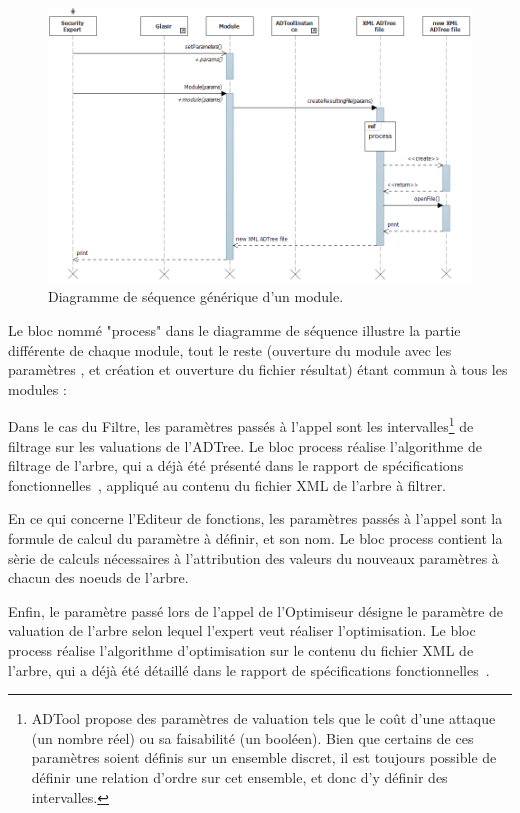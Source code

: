 	    \begin{figure}[H]
	        \centering
	        \includegraphics[height=0.75\textwidth]{figure/moduleSeqDiag.png}
	        \caption{Diagramme de séquence générique d'un module.}
	        \label{fig:moduleseq}
	    \end{figure}

Le bloc nommé "process" dans le diagramme de séquence illustre la partie différente de chaque module, tout le reste (ouverture du module avec les paramètres , et création et ouverture du fichier résultat) étant commun à tous les modules :

Dans le cas du Filtre, les paramètres passés à l'appel sont les intervalles\footnote{ADTool propose des paramètres de valuation tels que le coût d'une attaque (un nombre réel) ou sa faisabilité (un booléen). Bien que certains de ces paramètres soient définis sur un ensemble discret, il est toujours possible de définir une relation d'ordre sur cet ensemble, et donc d'y définir des intervalles.} de filtrage sur les valuations de l'ADTree. Le bloc process réalise l'algorithme de filtrage de l'arbre, qui a déjà été présenté dans le rapport de spécifications fonctionnelles~\cite{spec_fonc}, appliqué au contenu du fichier XML de l'arbre à filtrer.

En ce qui concerne l'Editeur de fonctions, les paramètres passés à l'appel sont la formule de calcul du paramètre à définir, et son nom. Le bloc process contient la sèrie de calculs nécessaires à l'attribution des valeurs du nouveaux paramètres à chacun des noeuds de l'arbre.  

Enfin, le paramètre passé lors de l'appel de l'Optimiseur désigne le paramètre de valuation de l'arbre selon lequel l'expert veut réaliser l'optimisation. Le bloc process réalise l'algorithme d'optimisation sur le contenu du fichier XML de l'arbre, qui a déjà été détaillé dans le rapport de spécifications fonctionnelles~\cite{spec_fonc}. 